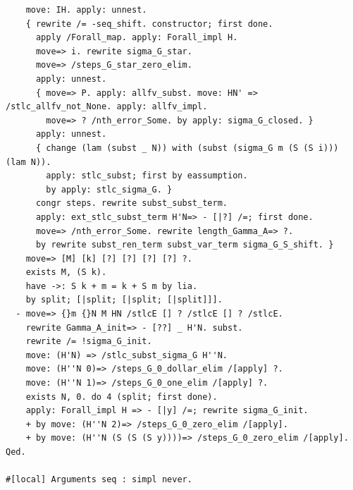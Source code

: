 \begin{lstlisting}
    move: IH. apply: unnest.
    { rewrite /= -seq_shift. constructor; first done.
      apply /Forall_map. apply: Forall_impl H.
      move=> i. rewrite sigma_G_star.
      move=> /steps_G_star_zero_elim.
      apply: unnest. 
      { move=> P. apply: allfv_subst. move: HN' => /stlc_allfv_not_None. apply: allfv_impl.
        move=> ? /nth_error_Some. by apply: sigma_G_closed. }
      apply: unnest. 
      { change (lam (subst _ N)) with (subst (sigma_G m (S (S i))) (lam N)).
        apply: stlc_subst; first by eassumption.
        by apply: stlc_sigma_G. }
      congr steps. rewrite subst_subst_term.
      apply: ext_stlc_subst_term H'N=> - [|?] /=; first done.
      move=> /nth_error_Some. rewrite length_Gamma_A=> ?.
      by rewrite subst_ren_term subst_var_term sigma_G_S_shift. }
    move=> [M] [k] [?] [?] [?] [?] ?.
    exists M, (S k).
    have ->: S k + m = k + S m by lia.
    by split; [|split; [|split; [|split]]].
  - move=> {}m {}N M HN /stlcE [] ? /stlcE [] ? /stlcE.
    rewrite Gamma_A_init=> - [??] _ H'N. subst.
    rewrite /= !sigma_G_init.
    move: (H'N) => /stlc_subst_sigma_G H''N.
    move: (H''N 0)=> /steps_G_0_dollar_elim /[apply] ?.
    move: (H''N 1)=> /steps_G_0_one_elim /[apply] ?.
    exists N, 0. do 4 (split; first done).
    apply: Forall_impl H => - [|y] /=; rewrite sigma_G_init.
    + by move: (H''N 2)=> /steps_G_0_zero_elim /[apply].
    + by move: (H''N (S (S (S y))))=> /steps_G_0_zero_elim /[apply].
Qed.

#[local] Arguments seq : simpl never.


\end{lstlisting}
